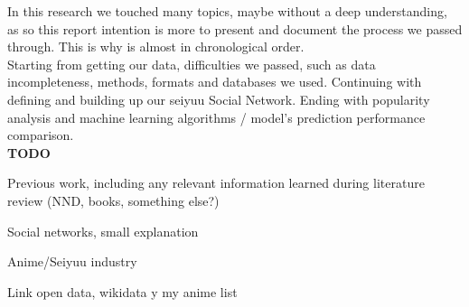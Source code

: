 In this research we touched many topics, maybe without a deep understanding, as so this report intention is more to present and document the process we passed through. This is why is almost in chronological order.\\

Starting from getting our data, difficulties we passed, such as data incompleteness, methods, formats and databases we used. Continuing with defining and building up our seiyuu Social Network. Ending with popularity analysis and machine learning algorithms / model's prediction performance comparison.\\






\textbf{TODO}


Previous work, including any relevant information learned during literature review (NND, books, something else?)

Social networks, small explanation

Anime/Seiyuu industry

Link open data, wikidata y my anime list
